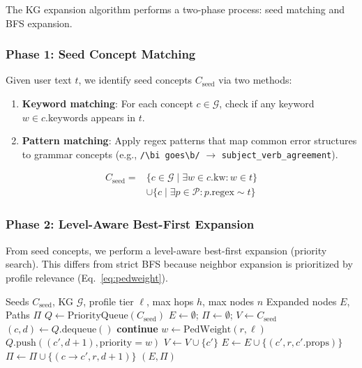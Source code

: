 \documentclass[11pt,a4paper,twocolumn]{article}
\begin{document}
The KG expansion algorithm performs a two-phase process: seed matching and BFS expansion.

\subsubsection{Phase 1: Seed Concept Matching}

Given user text $t$, we identify seed concepts $C_\text{seed}$ via two methods:

\begin{enumerate}[leftmargin=*]
  \item \textbf{Keyword matching}: For each concept $c \in \mathcal{G}$, check if any keyword $w \in c.\text{keywords}$ appears in $t$.
  \item \textbf{Pattern matching}: Apply regex patterns that map common error structures to grammar concepts (e.g., \texttt{/\textbackslash bi goes\textbackslash b/} $\rightarrow$ \texttt{subject\_verb\_agreement}).
\end{enumerate}

\begin{equation}
\begin{aligned}
C_\text{seed} ={}& \{c \in \mathcal{G} \mid \exists w \in c.\text{kw}: w \in t\} \\
& \cup \{c \mid \exists p \in \mathcal{P}: p.\text{regex} \sim t\}
\end{aligned}
\end{equation}

\subsubsection{Phase 2: Level-Aware Best-First Expansion}

From seed concepts, we perform a level-aware best-first expansion (priority search). This differs from strict BFS because neighbor expansion is prioritized by profile relevance (Eq.~\ref{eq:pedweight}).

\begin{algorithm}[h]
\caption{Level-Aware Best-First Graph Expansion}
\label{alg:bfs}
\footnotesize
\begin{algorithmic}[1]
\REQUIRE Seeds $C_\text{seed}$, KG $\mathcal{G}$, profile tier $\ell$, max hops $h$, max nodes $n$
\ENSURE Expanded nodes $E$, Paths $\Pi$
\STATE $Q \leftarrow \text{PriorityQueue}(C_\text{seed})$ 
\STATE $E \leftarrow \emptyset$; $\Pi \leftarrow \emptyset$; $V \leftarrow C_\text{seed}$
    \STATE $(c, d) \leftarrow Q.\text{dequeue}()$
        \STATE \textbf{continue}
    \ENDIF
        \STATE $w \leftarrow \text{PedWeight}(r, \ell)$ 
            \STATE $Q.\text{push}((c', d+1), \text{priority}=w)$
            \STATE $V \leftarrow V \cup \{c'\}$
            \STATE $E \leftarrow E \cup \{(c', r, c'.\text{props})\}$
            \STATE $\Pi \leftarrow \Pi \cup \{(c \rightarrow c', r, d+1)\}$
        \ENDIF
    \ENDFOR
\ENDWHILE
\RETURN $(E, \Pi)$
\end{algorithmic}
\end{algorithm}
\end{document}
